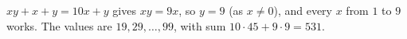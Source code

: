 $xy+x+y=10x+y$ gives $xy=9x$, so $y=9$ (as $x\ne0$), and every $x$ from $1$ to $9$ works. The values are $19,29,\dots,99$, with sum $10\cdot45+9\cdot9=\boxed{531}$.
